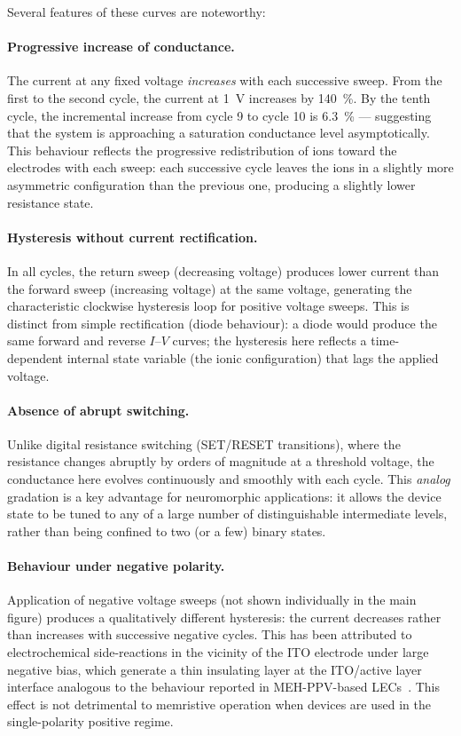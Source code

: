 \documentclass[12pt, a4paper, twoside]{report}
\begin{document}
Several features of these curves are noteworthy:

\paragraph{Progressive increase of conductance.} The current at any fixed voltage \textit{increases} with each successive sweep. From the first to the second cycle, the current at \SI{1}{\volt} increases by \SI{140}{\percent}. By the tenth cycle, the incremental increase from cycle 9 to cycle 10 is \SI{6.3}{\percent} — suggesting that the system is approaching a saturation conductance level asymptotically. This behaviour reflects the progressive redistribution of ions toward the electrodes with each sweep: each successive cycle leaves the ions in a slightly more asymmetric configuration than the previous one, producing a slightly lower resistance state.

\paragraph{Hysteresis without current rectification.} In all cycles, the return sweep (decreasing voltage) produces lower current than the forward sweep (increasing voltage) at the same voltage, generating the characteristic clockwise hysteresis loop for positive voltage sweeps. This is distinct from simple rectification (diode behaviour): a diode would produce the same forward and reverse $I$--$V$ curves; the hysteresis here reflects a time-dependent internal state variable (the ionic configuration) that lags the applied voltage.

\paragraph{Absence of abrupt switching.} Unlike digital resistance switching (SET/RESET transitions), where the resistance changes abruptly by orders of magnitude at a threshold voltage, the conductance here evolves continuously and smoothly with each cycle. This \textit{analog} gradation is a key advantage for neuromorphic applications: it allows the device state to be tuned to any of a large number of distinguishable intermediate levels, rather than being confined to two (or a few) binary states.

\paragraph{Behaviour under negative polarity.} Application of negative voltage sweeps (not shown individually in the main figure) produces a qualitatively different hysteresis: the current decreases rather than increases with successive negative cycles. This has been attributed to electrochemical side-reactions in the vicinity of the ITO electrode under large negative bias, which generate a thin insulating layer at the ITO/active layer interface analogous to the behaviour reported in MEH-PPV-based LECs~\cite{Wagberg2008, Fang2008}. This effect is not detrimental to memristive operation when devices are used in the single-polarity positive regime.
\end{document}
